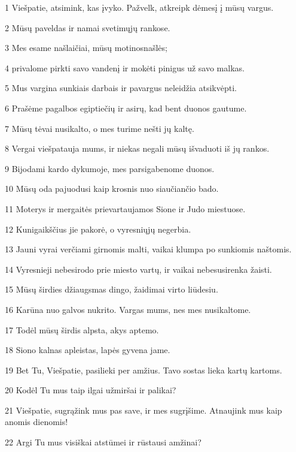 \par 1 Viešpatie, atsimink, kas įvyko. Pažvelk, atkreipk dėmesį į mūsų vargus. 
\par 2 Mūsų paveldas ir namai svetimųjų rankose. 
\par 3 Mes esame našlaičiai, mūsų motinos­našlės; 
\par 4 privalome pirkti savo vandenį ir mokėti pinigus už savo malkas. 
\par 5 Mus vargina sunkiais darbais ir pavargus neleidžia atsikvėpti. 
\par 6 Prašėme pagalbos egiptiečių ir asirų, kad bent duonos gautume. 
\par 7 Mūsų tėvai nusikalto, o mes turime nešti jų kaltę. 
\par 8 Vergai viešpatauja mums, ir niekas negali mūsų išvaduoti iš jų rankos. 
\par 9 Bijodami kardo dykumoje, mes parsigabenome duonos. 
\par 10 Mūsų oda pajuodusi kaip krosnis nuo siaučiančio bado. 
\par 11 Moterys ir mergaitės prievartaujamos Sione ir Judo miestuose. 
\par 12 Kunigaikščius jie pakorė, o vyresniųjų negerbia. 
\par 13 Jauni vyrai verčiami girnomis malti, vaikai klumpa po sunkiomis naštomis. 
\par 14 Vyresnieji nebesirodo prie miesto vartų, ir vaikai nebesusirenka žaisti. 
\par 15 Mūsų širdies džiaugsmas dingo, žaidimai virto liūdesiu. 
\par 16 Karūna nuo galvos nukrito. Vargas mums, nes mes nusikaltome. 
\par 17 Todėl mūsų širdis alpsta, akys aptemo. 
\par 18 Siono kalnas apleistas, lapės gyvena jame. 
\par 19 Bet Tu, Viešpatie, pasilieki per amžius. Tavo sostas lieka kartų kartoms. 
\par 20 Kodėl Tu mus taip ilgai užmiršai ir palikai? 
\par 21 Viešpatie, sugrąžink mus pas save, ir mes sugrįšime. Atnaujink mus kaip anomis dienomis! 
\par 22 Argi Tu mus visiškai atstūmei ir rūstausi amžinai?




